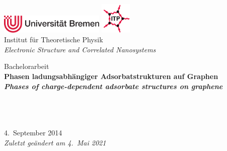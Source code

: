 \documentclass[a4paper, 10pt, twoside, openany]{book} %
\begin{document}
\frontmatter


\begin{titlepage}
    \centering

    \normalsize
    \includegraphics[width=5cm]{Abbildungen/Uni.pdf} \hfill \includegraphics[height=1.5cm]{Abbildungen/ITP.pdf} \\
    \hfill Institut für Theoretische Physik \\
    \hfill \emph{Electronic Structure and Correlated Nanosystems}

    \vfill

    \Large
    Bachelorarbeit \\[3pc]

    \bf \Huge
    Phasen ladungsabhängiger Adsorbatstrukturen auf Graphen \\[3pc]

    \it \normalsize
    Phases of charge-dependent adsorbate structures on graphene

    \vfill

    \normalfont \large
    \hspace{0cm}\hspace{1pc} \\[1pc]
    \hspace{0cm}\hspace{1pc} \\
    \hspace{0cm}\hspace{1pc} \\[2pc]

    4.~September 2014 \\[6pt]

    \normalsize \it
    Zuletzt geändert am 4.~Mai 2021

    \vfill
\end{titlepage}


\tableofcontents
\end{document}
